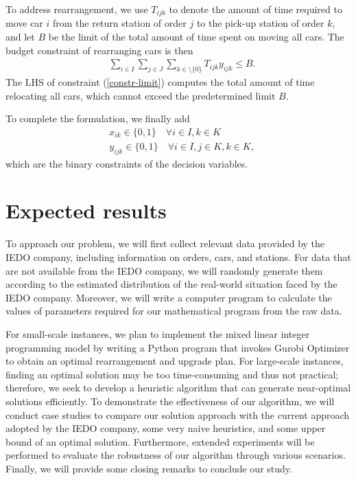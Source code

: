 \documentclass[11pt,a4paper]{article}
\begin{document}
To address rearrangement, we use $T_{ijk}$ to denote the amount of time required to move car $i$ from the return station of order $j$ to the pick-up station of order $k$, and let $B$ be the limit of the total amount of time spent on moving all cars. The budget constraint of  rearranging cars is then
\begin{align}
    & \sum_{i \in I} \sum_{j \in J} \sum_{k \in \setminus \{0\}} T_{ijk}y_{ijk} \leq B \label{constr-limit}.
\end{align}
The LHS of constraint (\ref{constr-limit}) computes the total amount of time relocating all cars, which cannot exceed the predetermined limit $B$.

To complete the formulation, we finally add 
\begin{align}
    & x_{ik} \in \{0,1\} \quad \forall i \in I, k \in K  \label{constr-binary-x} \\
    & y_{ijk} \in \{0,1\} \quad 
    \forall i \in I, j \in K, k \in K, \label{constr-binary-y}
\end{align}
which are the binary constraints of the decision variables.










\section{Expected results}
\label{sec-expected}

To approach our problem, we will first collect relevant data provided by the IEDO company, including information on orders, cars, and stations. For data that are not available from the IEDO company, we will randomly generate them according to the estimated distribution of the real-world situation faced by the IEDO company. Moreover, we will write a computer program to calculate the values of parameters required for our mathematical program from the raw data. 

For small-scale instances, we plan to implement the mixed linear integer programming model by writing a Python program that invokes Gurobi Optimizer to obtain an optimal rearrangement and upgrade plan. For large-scale instances, finding an optimal solution may be too time-consuming and thus not practical; therefore, we seek to develop a heuristic algorithm that can generate near-optimal solutions efficiently. To demonstrate the effectiveness of our algorithm, we will conduct case studies to compare our solution approach with the current approach adopted by the IEDO company, some very naive heuristics, and some upper bound of an optimal solution. Furthermore, extended experiments will be performed to evaluate the robustness of our algorithm through various scenarios. Finally, we will provide some closing remarks to conclude our study.
\end{document}
